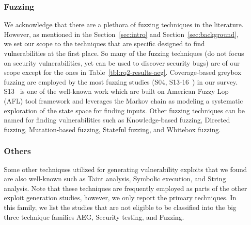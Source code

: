 \subsubsection{Fuzzing}
We acknowledge that there are a plethora of fuzzing techniques in the literature. However, as mentioned in the Section~\ref{sec:intro} and Section~\ref{sec:background}, we set our scope to the techniques that are specific designed to find vulnerabilities at the first place. So many of the fuzzing techniques (do not focus on security vulnerabilities, yet can be used to discover security bugs) are of our scope except for the ones in Table~\ref{tbl:rq2-results-aeg}. Coverage-based greybox fuzzing are employed by the most fuzzing studies (S04, S13-16~\cite{Bohme2019489, Liu2018, Wuestholz20201398, Gong2022374}) in our survey. S13~\cite{Bohme2019489} is one of the well-known work which are built on American Fuzzy Lop (AFL) tool framework and leverages the Markov chain as modeling a systematic exploration of the state space for finding inputs. Other fuzzing techniques can be named for finding vulnerabilities such as Knowledge-based fuzzing, Directed fuzzing, Mutation-based fuzzing, Stateful fuzzing, and Whitebox fuzzing.

\subsubsection{Others}
Some other techniques utilized for generating vulnerability exploits that we found are also well-known such as Taint analysis, Symbolic execution, and String analysis. Note that these techniques are frequently employed as parts of the other exploit generation studies, however, we only report the primary techniques. In this family, we list the studies that are not eligible to be classified into the big three technique families AEG, Security testing, and Fuzzing.